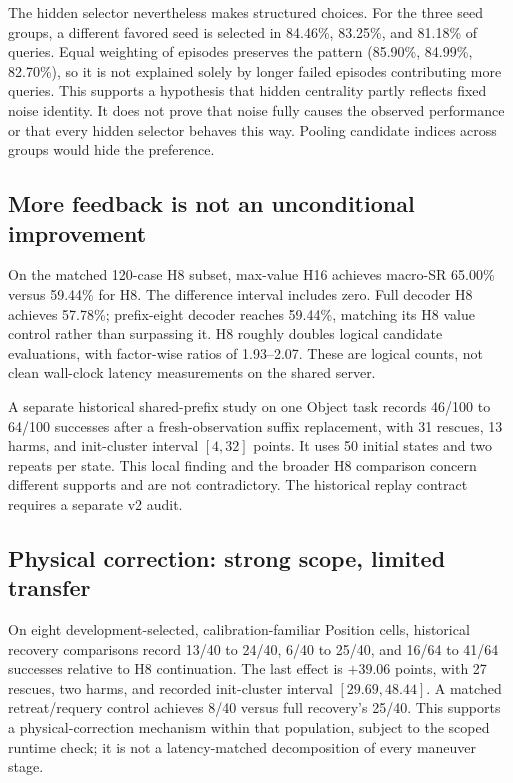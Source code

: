 The hidden selector nevertheless makes structured choices. For the three
seed groups, a different favored seed is selected in 84.46\%, 83.25\%, and
81.18\% of queries. Equal weighting of episodes preserves the pattern
(85.90\%, 84.99\%, 82.70\%), so it is not explained solely by longer failed
episodes contributing more queries. This supports a hypothesis that hidden
centrality partly reflects fixed noise identity. It does not prove that noise
fully causes the observed performance or that every hidden selector behaves
this way. Pooling candidate indices across groups would hide the preference.

\subsection{More feedback is not an unconditional improvement}
On the matched 120-case H8 subset, max-value H16 achieves macro-SR 65.00\%
versus 59.44\% for H8. The difference interval includes zero. Full decoder
H8 achieves 57.78\%; prefix-eight decoder reaches 59.44\%, matching its
H8 value control rather than surpassing it. H8 roughly doubles logical
candidate evaluations, with factor-wise ratios of 1.93--2.07. These are
logical counts, not clean wall-clock latency measurements on the shared server.

A separate historical shared-prefix study on one Object task records
46/100 to 64/100 successes after a fresh-observation suffix replacement,
with 31 rescues, 13 harms, and init-cluster interval $[4,32]$ points.
It uses 50 initial states and two repeats per state. This local finding
and the broader H8 comparison concern different supports and are not
contradictory. The historical replay contract requires a separate v2 audit.

\subsection{Physical correction: strong scope, limited transfer}
On eight development-selected, calibration-familiar Position cells,
historical recovery comparisons record 13/40 to 24/40, 6/40 to 25/40,
and 16/64 to 41/64 successes relative to H8 continuation. The last effect
is $+39.06$ points, with 27 rescues, two harms, and recorded init-cluster
interval $[29.69,48.44]$. A matched retreat/requery control achieves 8/40
versus full recovery's 25/40. This supports a physical-correction mechanism
within that population, subject to the scoped runtime check; it is not a
latency-matched decomposition of every maneuver stage.

